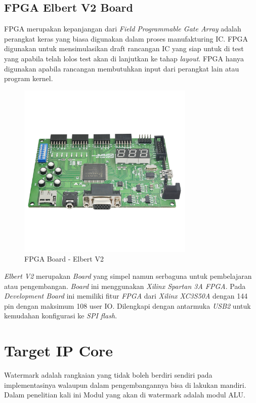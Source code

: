 \subsection{FPGA Elbert V2 Board}
FPGA merupakan kepanjangan dari \textit{Field Programmable Gate Array} adalah perangkat keras yang biasa digunakan dalam proses manufakturing IC. FPGA digunakan untuk mensimulasikan draft rancangan IC yang siap untuk di test yang apabila telah lolos test akan di lanjutkan ke tahap \textit{layout}. FPGA hanya digunakan apabila rancangan membutuhkan input dari perangkat lain atau program kernel.

\begin{figure}
	\centering
	\includegraphics[width=0.75\textwidth]
	{pics/elbertv2.jpg}
	\caption{FPGA Board - Elbert V2\cite{link.board}}
	\label{fig:fpga}
\end{figure}

\textit{Elbert V2} merupakan \textit{Board} yang simpel namun serbaguna untuk pembelajaran atau pengembangan. \textit{Board} ini menggunakan \textit{Xilinx Spartan 3A FPGA}. Pada \textit{Development Board} ini memiliki fitur \textit{FPGA} dari \textit{Xilinx XC3S50A} dengan 144 pin dengan maksimum 108 user IO. Dilengkapi dengan antarmuka \textit{USB2} untuk kemudahan konfigurasi ke \textit{SPI flash}. 

% 

\section{Target IP Core}
Watermark adalah rangkaian yang tidak boleh berdiri sendiri pada implementasinya walaupun dalam pengembangannya bisa di lakukan mandiri. Dalam penelitian kali ini Modul yang akan di watermark adalah modul ALU.

